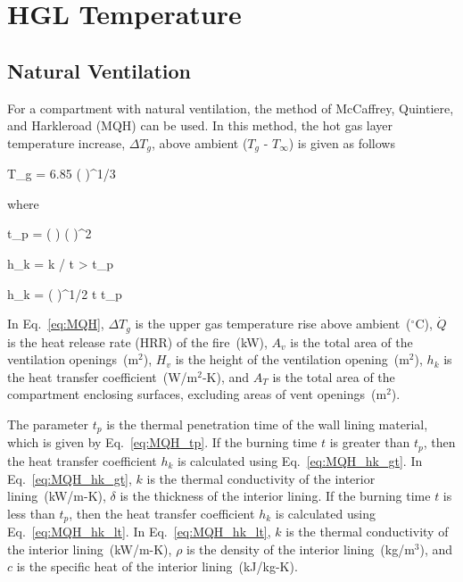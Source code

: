 \chapter{HGL Temperature}
\label{HGL_Chapter}

\section{Natural Ventilation}

For a compartment with natural ventilation, the method of McCaffrey, Quintiere, and Harkleroad (MQH) can be used. In this method, the hot gas layer temperature increase, $\Delta T_g$, above ambient ($T_g$ - $T_\infty$) is given as follows

\be
\Delta T_g = 6.85 \left(  \right)^{1/3}
\label{eq:MQH}
\ee

\noindent where

\be
t_p = \left(  \right) \left(  \right)^2
\label{eq:MQH_tp}
\ee

\be
h_k = k / \delta {} t > t_p
\label{eq:MQH_hk_gt}
\ee

\be
h_k = \left(  \right)^{1/2}  t \le t_p
\label{eq:MQH_hk_lt}
\ee

In Eq.~\ref{eq:MQH}, $\Delta T_g$ is the upper gas temperature rise above ambient~($^\circ$C), $\dot Q$ is the heat release rate (HRR) of the fire~(kW), $A_v$ is the total area of the ventilation openings~(m$^2$), $H_v$ is the height of the ventilation opening~(m$^2$), $h_k$ is the heat transfer coefficient~(W/m$^2$-K), and $A_T$ is the total area of the compartment enclosing surfaces, excluding areas of vent openings~(m$^2$). 

The parameter $t_p$ is the thermal penetration time of the wall lining material, which is given by Eq.~\ref{eq:MQH_tp}. If the burning time $t$ is greater than $t_p$, then the heat transfer coefficient $h_k$ is calculated using Eq.~\ref{eq:MQH_hk_gt}. In Eq.~\ref{eq:MQH_hk_gt}, $k$ is the thermal conductivity of the interior lining~(kW/m-K), $\delta$ is the thickness of the interior lining. If the burning time $t$ is less than $t_p$, then the heat transfer coefficient $h_k$ is calculated using Eq.~\ref{eq:MQH_hk_lt}. In Eq.~\ref{eq:MQH_hk_lt}, $k$ is the thermal conductivity of the interior lining~(kW/m-K), $\rho$ is the density of the interior lining~(kg/m$^3$), and $c$ is the specific heat of the interior lining~(kJ/kg-K).

